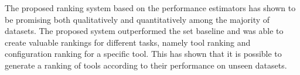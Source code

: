 The proposed ranking system based on the performance estimators has shown to be promising both qualitatively and quantitatively among the majority of datasets. The proposed system outperformed the set baseline and was able to create valuable rankings for different tasks, namely tool ranking and configuration ranking for a specific tool. This has shown that it is possible to generate a ranking of tools according to their performance on unseen datasets.

